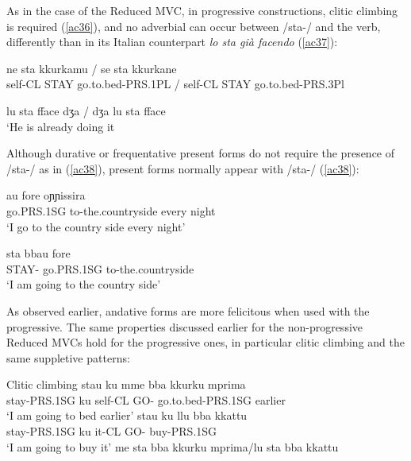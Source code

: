 \documentclass[output=paper]{langscibook}
\begin{document}
As in the case of the Reduced MVC, in progressive constructions, clitic climbing is required (\ref{ac36}), and no adverbial can occur between /sta-/ and the verb, differently than in its Italian counterpart \textit{lo sta già facendo} (\ref{ac37}):

\ea\label{ac36}
    \ea\label{ac36a} \gll ne   sta     kkurkamu    /  se    sta   kkurkane\\
    self-CL  STAY go.to.bed-PRS.1PL / self-CL STAY go.to.bed-PRS.3Pl\\
    \z
\z

\ea\label{ac37}
    \ex \label{ac37b}lu sta fface dʒa / dʒa lu sta fface\\
     ‘He is already doing it
    \z
\z

Although durative or frequentative present forms do not require the presence of /sta-/ as in (\ref{ac38}), present forms normally appear with /sta-/ (\ref{ac38}):

\ea \label{ac38}\gll  au        fore         oɲɲissira\\
   go.PRS.1SG  to-the.countryside every night\\
 \glt  ‘I go to the country side every night’
\z

\ea \label{ac39}\gll sta    bbau       fore\\
   STAY- go.PRS.1SG  to-the.countryside \\
\glt   ‘I am going to the country side’
\z

As observed earlier, andative forms are more felicitous when used with the progressive. The same properties discussed earlier for the non-progressive Reduced MVCs hold for the progressive ones, in particular clitic climbing and the same suppletive patterns:

\ea \label{ac40}Clitic climbing 
    \ea \label{ac40a}
        \ea \gll stau       ku  mme   bba  kkurku      mprima\\
      stay-PRS.1SG ku self-CL  GO- go.to.bed-PRS.1SG earlier\\
      \glt ‘I am going to bed earlier’
        \ex \gll stau       ku   llu   bba   kkattu\\
      stay-PRS.1SG  ku   it-CL  GO-  buy-PRS.1SG\\
      \glt ‘I am going to buy it’
        \z
    \ex \label{ac40b}me sta bba kkurku mprima/lu sta bba kkattu
    \z
\z
\end{document}
